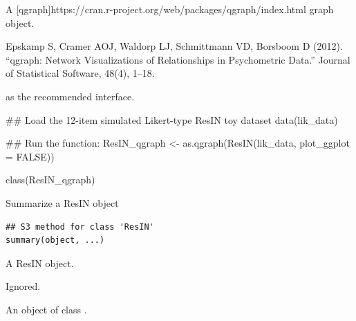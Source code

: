 \documentclass[a4paper]{book}
\begin{document}
%
\begin{Value}
A [qgraph]https://cran.r-project.org/web/packages/qgraph/index.html graph object.
\end{Value}
%
\begin{References}
Epskamp S, Cramer AOJ, Waldorp LJ, Schmittmann VD, Borsboom D (2012). “qgraph: Network Visualizations of Relationships in Psychometric Data.” Journal of Statistical Software, 48(4), 1–18.
\end{References}
%
\begin{SeeAlso}
 as the recommended interface.
\end{SeeAlso}
%
\begin{Examples}
\begin{ExampleCode}
## Load the 12-item simulated Likert-type ResIN toy dataset
data(lik_data)

## Run the function:
ResIN_qgraph <-  as.qgraph(ResIN(lik_data, plot_ggplot = FALSE))

class(ResIN_qgraph)

\end{ExampleCode}
\end{Examples}
%
\begin{Description}
Summarize a ResIN object
\end{Description}
%
\begin{Usage}
\begin{verbatim}
## S3 method for class 'ResIN'
summary(object, ...)
\end{verbatim}
\end{Usage}
%
\begin{Arguments}
\begin{ldescription}
\item[\code{object}] A ResIN object.

\item[\code{...}] Ignored.
\end{ldescription}
\end{Arguments}
%
\begin{Value}
An object of class .
\end{Value}
\printindex{}
\end{document}
